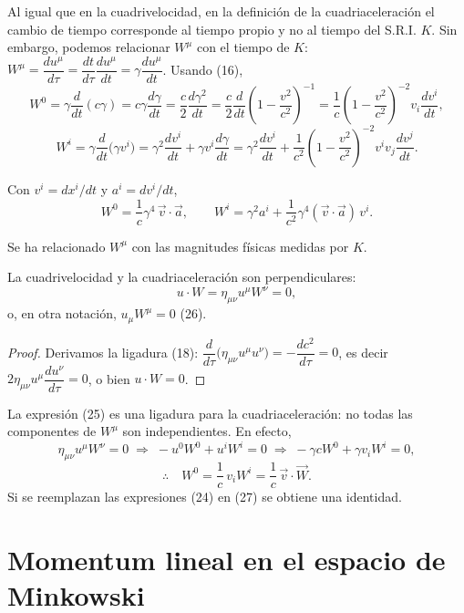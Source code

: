 Al igual que en la cuadrivelocidad, en la definición de la
cuadriaceleración el cambio de tiempo corresponde al tiempo propio y no
al tiempo del S.R.I. $K$. Sin embargo, podemos relacionar $W^\mu$ con el
tiempo de $K$: $W^\mu=\dfrac{du^\mu}{d\tau}=\dfrac{dt}{d\tau}\dfrac{
du^\mu}{dt}=\gamma\dfrac{du^\mu}{dt}$. Usando (16),
\[
W^0 = \gamma\frac{d}{dt}(c\gamma) = c\gamma\frac{d\gamma}{dt} =
\frac c2\frac{d\gamma^2}{dt} = \frac c2\frac{d}{dt}\left(1-\frac{v^2}
{c^2}\right)^{-1} = \frac1c\left(1-\frac{v^2}{c^2}\right)^{-2}v_i
\frac{dv^i}{dt},
\]
\[
W^i = \gamma\frac{d}{dt}\big(\gamma v^i\big) = \gamma^2\frac{dv^i}{dt}+
\gamma v^i\frac{d\gamma}{dt} = \gamma^2\frac{dv^i}{dt} + \frac{1}{c^2}
\left(1-\frac{v^2}{c^2}\right)^{-2}v^iv_j\frac{dv^j}{dt}.
\]

\begin{proposicionc}
Con $v^i=dx^i/dt$ y $a^i=dv^i/dt$,
\[
W^0 = \frac1c\gamma^4\,\vec v\cdot\vec a, \qquad W^i = \gamma^2a^i +
\frac{1}{c^2}\gamma^4(\vec v\cdot\vec a)\,v^i . \tag{24}
\]
\end{proposicionc}

Se ha relacionado $W^\mu$ con las magnitudes físicas medidas por $K$.

\begin{proposicionc}
La cuadrivelocidad y la cuadriaceleración son perpendiculares:
\[
u\cdot W = \eta_{\mu\nu}u^\mu W^\nu = 0, \tag{25}
\]
o, en otra notación, $u_\mu W^\mu=0$ (26).
\end{proposicionc}

\begin{proof}
Derivamos la ligadura (18): $\dfrac{d}{d\tau}\big(\eta_{\mu\nu}u^\mu
u^\nu\big)=-\dfrac{dc^2}{d\tau}=0$, es decir $2\eta_{\mu\nu}u^\mu
\dfrac{du^\nu}{d\tau}=0$, o bien $u\cdot W=0$. \qedhere
\end{proof}

La expresión (25) es una ligadura para la cuadriaceleración: no todas
las componentes de $W^\mu$ son independientes. En efecto,
\[
\eta_{\mu\nu}u^\mu W^\nu=0 \;\Rightarrow\; -u^0W^0+u^iW^i=0
\;\Rightarrow\; -\gamma cW^0+\gamma v_iW^i=0,
\]
\[
\therefore\quad W^0 = \frac1c\,v_iW^i = \frac1c\,\vec v\cdot\vec W .
\tag{27}
\]
Si se reemplazan las expresiones (24) en (27) se obtiene una identidad.

\section{Momentum lineal en el espacio de Minkowski}

